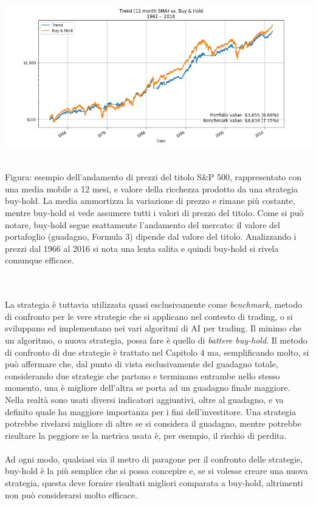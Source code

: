 \documentclass[a4paper,12pt]{report}
\begin{document}
\begin{fig}
	\includegraphics[width=16cm]{buy_hold}
	\caption \\~\\Figura: esempio dell'andamento di prezzi del titolo S\&P 500, rappresentato con una media mobile a 12 mesi, e valore della ricchezza prodotto da una strategia buy-hold. La media ammortizza la variazione di prezzo e rimane più costante, mentre buy-hold si vede assumere tutti i valori di prezzo del titolo. Come si può notare, buy-hold segue esattamente l'andamento del mercato: il valore del portafoglio (guadagno, Formula 3) dipende dal valore del titolo. Analizzando i prezzi dal 1966 al 2016 si nota una lenta salita e quindi buy-hold si rivela comunque efficace.
\end{fig}
\\~\\La strategia è tuttavia utilizzata quasi esclusivamente come \textit{benchmark}, metodo di confronto per le vere strategie che si applicano nel contesto di trading, o si sviluppano ed implementano nei vari algoritmi di AI per trading. Il minimo che un algoritmo, o nuova strategia, possa fare è quello di \textit{battere buy-hold}. Il metodo di confronto di due strategie è trattato nel Capitolo 4 ma, semplificando molto, si può affermare che, dal punto di vista esclusivamente del guadagno totale, considerando due strategie che partono e terminano entrambe nello stesso momento, una è migliore dell'altra se porta ad un guadagno finale maggiore. Nella realtà sono usati diversi indicatori aggiuntivi, oltre al guadagno, e va definito quale ha maggiore importanza per i fini dell'investitore. Una strategia potrebbe rivelarsi migliore di altre se si considera il guadagno, mentre potrebbe risultare la peggiore se la metrica usata è, per esempio, il rischio di perdita.\\~\\Ad ogni modo, qualsiasi sia il metro di paragone per il confronto delle strategie, buy-hold è la più semplice che si possa concepire e, se si volesse creare una nuova strategia, questa deve fornire risultati migliori comparata a buy-hold, altrimenti non può considerarsi molto efficace.
\end{document}
